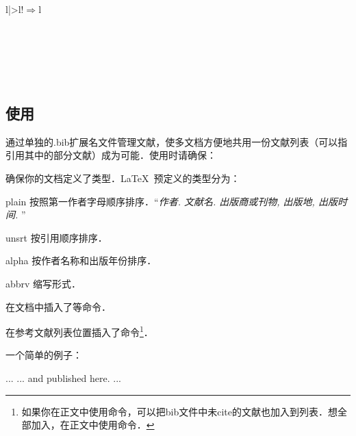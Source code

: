 \begin{table}[!hbt]
\begin{tabular}{l|>{\ttfamily}l!{$\Rightarrow$}l}
 \\
\hline
{} \\
\hline
{} \\
\hline
{} \\
\hline
{} \\
\hline
{} \\
\hline
\end{tabular}
\end{table}

\subsection{\bibtex 使用}
\bibtex 通过单独的.bib扩展名文件管理文献，使多文档方便地共用一份文献列表（可以指引用其中的部分文献）成为可能．使用时请确保：
\begin{feae}
\item 确保你的文档定义了类型．\LaTeX\ 预定义的类型分为：
  \begin{para}
    \item[plain] 按照第一作者字母顺序排序．“\textit{作者. 文献名. 出版商或刊物, 出版地, 出版时间.} ”
    \item[unsrt] 按引用顺序排序．
    \item[alpha] 按作者名称和出版年份排序．
    \item[abbrv] 缩写形式．
  \end{para}
\item 在文档中插入了等命令．
\item 在参考文献列表位置插入了命令\footnote{如果你在正文中使用命令，可以把bib文件中未cite的文献也加入到列表．想全部加入，在正文中使用命令．}．
\end{feae}

一个简单的例子：
\begin{latex}


    ...
    ... and published here\cite{Smith93TRB}.
    ...
    

\end{latex}

